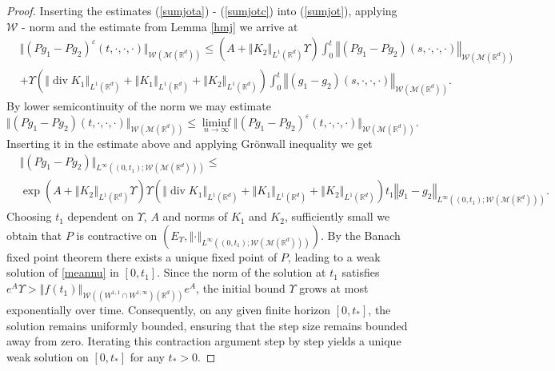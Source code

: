 \documentclass[10pt]{article}
\def\divv{\operatorname {div}}
\DeclareMathOperator*{\esssup}{ess~sup}
\newcommand{\eqq}[2]{\begin{equation}  #1  \label{#2}\end{equation}    }
\newcommand*{\norm}[1]{\left\Vert{#1}\right\Vert}
\newcommand{\vf}{\varphi}
\newcommand{\ve}{\varepsilon}
\newcommand{\R}{\mathbb{R}}
\newcommand{\izj}{\int_{0}^{1}}
\newcommand{\W}{\mathcal{W}}
\begin{document}
\begin{proof}
Inserting the estimates (\ref{sumjota}) - (\ref{sumjotc}) into (\ref{sumjot}), applying $\W$ - norm and the estimate from Lemma \ref{hmj}  we arrive at
\begin{align*}
    &\Vert (Pg_1-Pg_2)^\ve (t,\cdot,\cdot,\cdot)\Vert_{\W(\mathcal{M}(\R^d))}\leq  
    \left(A + \norm{K_{2}}_{L^{1}(\R^d)}\Upsilon\right)\int_0^t\norm{(Pg_1-Pg_2)(s,\cdot,\cdot,\cdot)}_{\W(\mathcal{M}( \R^d))}\\
    &+ \Upsilon \left(\norm{\divv K_1}_{L^1(\R^d)} + \norm{ K_1}_{L^1(\R^d)} + \norm{ K_2}_{L^1(\R^d)}\right)\int_0^t\norm{(g_1-g_2)(s,\cdot,\cdot,\cdot)}_{\W(\mathcal{M}(\R^d))}.
\end{align*}
By lower semicontinuity of the norm we may estimate 
\[
\Vert (Pg_1-Pg_2) (t,\cdot,\cdot,\cdot)\Vert_{\W(\mathcal{M}(\R^d))}\leq \liminf_{n\rightarrow \infty} \Vert (Pg_1-Pg_2)^\ve (t,\cdot,\cdot,\cdot)\Vert_{\W(\mathcal{M}(\R^d))}.
\]
Inserting it in the estimate above and applying Gr\"onwall inequality we get
\begin{align*}
  &\Vert (Pg_1-Pg_2)\Vert_{L^{\infty}((0,t_{1});\W(\mathcal{M}(\R^d)))} \leq \\
  &\exp\left(A + \norm{K_{2}}_{L^{1}(\R^d)}\Upsilon\right)\Upsilon \left(\norm{\divv K_1}_{L^1(\R^d)} + \norm{ K_1}_{L^1(\R^d)} + \norm{ K_2}_{L^1(\R^d)}\right)t_{1}\norm{g_1-g_2}_{L^\infty((0,t_{1});\W(\mathcal{M}(\R^d)))}. 
\end{align*}
Choosing $t_{1}$ dependent on $\Upsilon$, $A$ and norms of $K_{1}$ and $K_{2}$, sufficiently small we obtain that $P$ is contractive on $(E_{\Upsilon},\norm{\cdot}_{L^{\infty}((0,t_{1});\W(\mathcal{M}(\R^d)))})$. By the Banach fixed point theorem there exists a unique fixed point  of $P$, leading to a weak solution of \eqref{meannu} in $[0, t_1]$.
Since the norm of the solution at $t_1$ satisfies $e^A\Upsilon> \norm{f(t_1)}_{\W((W^{1,1}\cap W^{1,\infty})(\R^d))}e^{A}$, the initial bound $\Upsilon$ grows at most exponentially over time. Consequently, on any given finite horizon $[0, t_{*}]$, the solution remains uniformly bounded, ensuring that the step size remains bounded away from zero. Iterating this contraction argument step by step yields a unique weak solution on $[0, t_{*}]$ for any $t_{*} > 0$.

\end{proof}
\end{document}
